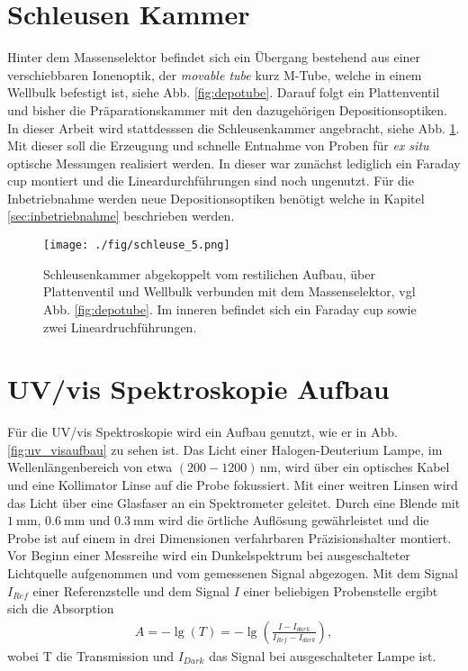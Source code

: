 \section{Schleusen Kammer}
\label{sec:schleuse}
Hinter dem Massenselektor befindet sich ein Übergang bestehend aus einer verschiebbaren Ionenoptik, der \textit{movable tube} kurz M-Tube, welche in einem Wellbulk befestigt ist, siehe Abb. \ref{fig:depotube}.
Darauf folgt ein Plattenventil und bisher die Präparationskammer mit den dazugehörigen Depositionsoptiken.
In dieser Arbeit wird stattdesssen die Schleusenkammer angebracht, siehe Abb. \ref{fig:schleuse}.
Mit dieser soll die Erzeugung und schnelle Entnahme von Proben für \textit{ex situ} optische Messungen realisiert werden.
In dieser war zunächst lediglich ein Faraday cup montiert und die Lineardurchführungen sind noch ungenutzt.
Für die Inbetriebnahme werden neue Depositionsoptiken benötigt welche in Kapitel \ref{sec:inbetriebnahme} beschrieben werden.

\begin{figure}
    \centering
    \texttt{[image: ./fig/schleuse\_5.png]}
    \caption{Schleusenkammer abgekoppelt vom restilichen Aufbau, über Plattenventil und Wellbulk verbunden mit dem Massenselektor, vgl Abb. \ref{fig:depotube}. Im inneren befindet sich ein Faraday cup sowie zwei Lineardruchführungen.}
    \label{fig:schleuse}
\end{figure}


\section{UV/vis Spektroskopie Aufbau}
Für die UV/vis Spektroskopie wird ein Aufbau genutzt, wie er in Abb. \ref{fig:uv_visaufbau} zu sehen ist.
Das Licht einer Halogen-Deuterium Lampe, im Wellenlängenbereich von etwa $(200-1200)\,$nm, wird über ein optisches Kabel und eine Kollimator Linse auf die Probe fokussiert.
Mit einer weitren Linsen wird das Licht über eine Glasfaser an ein Spektrometer geleitet.
Durch eine Blende mit $\SI{1}{\milli\meter}$, $\SI{0,6}{\milli\meter}$ und $\SI{0,3}{\milli\meter}$ wird die örtliche Auflösung gewährleistet und die Probe ist auf einem in drei Dimensionen verfahrbaren Präzisionshalter montiert.\\
Vor Beginn einer Messreihe wird ein Dunkelspektrum bei ausgeschalteter Lichtquelle aufgenommen und vom gemessenen Signal abgezogen. 
Mit dem Signal $I_{Ref}$ einer Referenzstelle und dem Signal $I$ einer beliebigen Probenstelle ergibt sich die Absorption 
\begin{align}
    A=- \lg\left(T\right) = -\lg\left(\frac{I-I_{dark}}{I_{Ref}-I_{dark}}\right),
\end{align}
wobei T die Transmission und $I_{Dark}$ das Signal bei ausgeschalteter Lampe ist.

